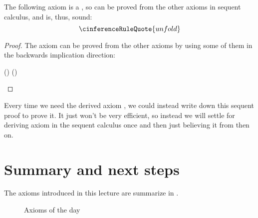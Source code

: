 \documentclass[11pt,twoside]{scrartcl}
\begin{document}
\begin{lemma}
  The following axiom is a , so can be proved from the other axioms in sequent calculus, and is, thus, sound:
  \[
  \cinferenceRuleQuote{unfold}
  \]
\end{lemma}
\begin{proof}
The axiom  can be proved from the other axioms by using some of them in the backwards implication direction:
\begin{sequentdeduction}[array]
\linfer[composeb]
{\linfer[ifb]
  {\linfer[whileiterateb]
    {\lclose}
    {\lsequent{} {{\dbox{\pwhile{\ivr}{\ausprg}}{\ausfml}}\lbisubjunct
 {\dbox{\pifs{\ivr}{\plgroup\ausprg;\pwhile{\ivr}{\ausprg}\prgroup}}{\ausfml}}}}
 }
  {\lsequent{} {{\dbox{\pwhile{\ivr}{\ausprg}}{\ausfml}}\lbisubjunct
 {(\ivr\limply\dbox{\ausprg;\pwhile{\ivr}{\ausprg}}{\ausfml}) \land (\lnot\ivr\limply\ausfml)}}}
}
{\lsequent{} {{\dbox{\pwhile{\ivr}{\ausprg}}{\ausfml}}\lbisubjunct
 {(\ivr\limply\dbox{\ausprg}{\dbox{\pwhile{\ivr}{\ausprg}}{\ausfml}}) \land (\lnot\ivr\limply\ausfml)}}}
\end{sequentdeduction}
\end{proof}

Every time we need the derived axiom , we could instead write down this sequent proof to prove it.
It just won't be very efficient, so instead we will settle for deriving axiom  in the sequent calculus once and then just believing it from then on.

\section{Summary and next steps}
The axioms introduced in this lecture are summarize in .
\begin{figure}[tbp]
  \begin{calculus}
  \end{calculus}
  \caption{Axioms of the day}
  \label{fig:elementary-program-axioms}
\end{figure}
\end{document}
